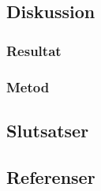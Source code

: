 \subsection{Diskussion}
\subsubsection{Resultat}
\subsubsection{Metod}
\subsection{Slutsatser}
\subsection{Referenser}
\vspace{-9mm}
\begin{thebibliography}{9}

\end{thebibliography}
